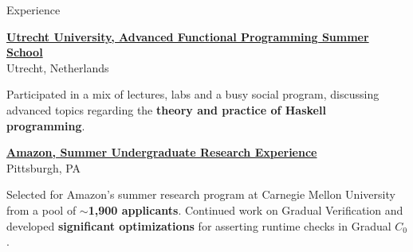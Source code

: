 
\begin{rSection}{Experience}

	{\textbf{\large{\href{https://uu-afp.github.io/about.html}{Utrecht University, Advanced Functional Programming Summer School \ExternalLink}}} \hfill \color{darkgray}{07/2023} 
	\\ \vspace*{1mm}
	 \hfill{Utrecht, Netherlands} 
	\\ 
	\color{black}
	\begin{minipage}{40em}
			 Participated in a mix of lectures, labs and a busy social program, discussing advanced topics regarding the \textbf{theory and practice of Haskell programming}.
	\end{minipage}}

	{\textbf{\large{\href{https://s3d.cmu.edu/sure/index.html}{Amazon, Summer Undergraduate Research Experience \ExternalLink}}} \hfill \color{darkgray}{06/2023 - 08/2023} 
	\\ \vspace*{1mm}
	 \hfill{Pittsburgh, PA} 
	\\ 
	\color{black}
	\begin{minipage}{40em}
		Selected for Amazon's summer research program at Carnegie Mellon University from a pool of \textbf{$\sim$1,900 applicants}. Continued work on Gradual Verification and developed \textbf{significant optimizations} for asserting runtime checks in Gradual $C_0$.
	\end{minipage}}


\end{rSection}

